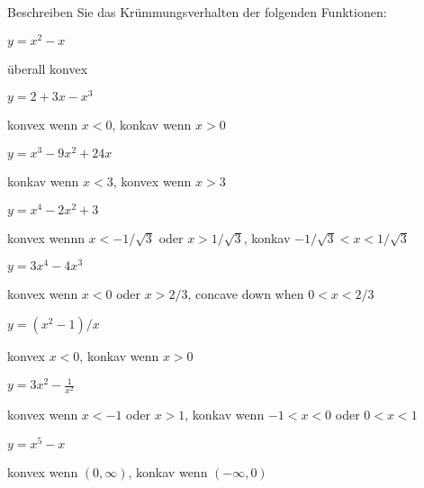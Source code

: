 \begin{exercises}
\noindent Beschreiben Sie das Krümmungsverhalten der folgenden Funktionen:

\twocol

\begin{exercise} $y=x^2-x$ 
\begin{answer} überall konvex
\end{answer}\end{exercise}

\begin{exercise} $y=2+3x-x^3$ 
\begin{answer} konvex wenn $x<0$, konkav wenn $x>0$
\end{answer}\end{exercise}

\begin{exercise} $y=x^3-9x^2+24x$
\begin{answer} konkav wenn $x<3$, konvex wenn $x>3$
\end{answer}\end{exercise}

\begin{exercise} $y=x^4-2x^2+3$ 
\begin{answer} konvex wennn $x<-1/\sqrt3$ oder $x>1/\sqrt3$,
konkav $-1/\sqrt3<x<1/\sqrt3$
\end{answer}\end{exercise}

\begin{exercise} $y=3x^4-4x^3$
\begin{answer} konvex wenn $x<0$ oder $x>2/3$,
concave down when $0<x<2/3$
\end{answer}\end{exercise}

\begin{exercise} $y=(x^2-1)/x$
\begin{answer} konvex $x<0$, konkav wenn $x>0$
\end{answer}\end{exercise}

\begin{exercise} $y=3x^2-\frac{1}{x^2}$ 
\begin{answer} konvex wenn $x<-1$ oder $x>1$, konkav wenn
$-1<x<0$ oder $0<x<1$
\end{answer}\end{exercise}

\begin{exercise} $y= x^5 - x$
\begin{answer} konvex wenn $(0,\infty)$, konkav wenn $(-\infty,0)$
\end{answer}\end{exercise}


\end{exercises}

